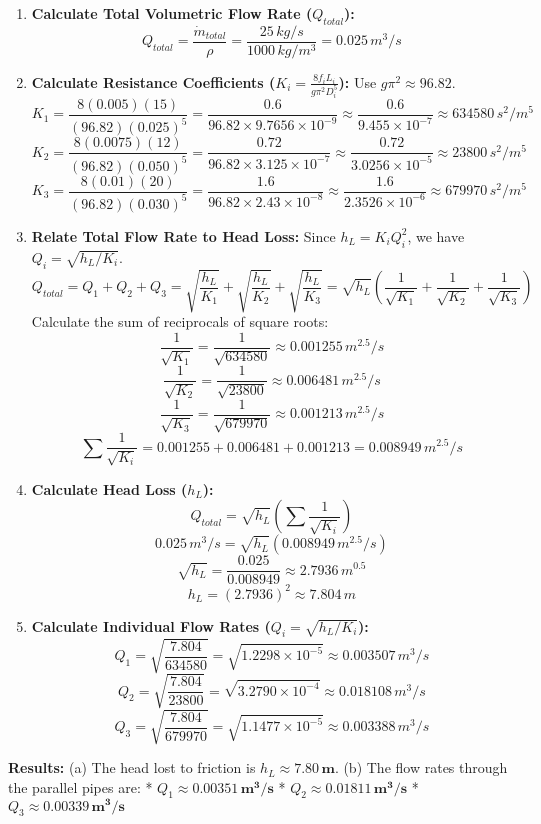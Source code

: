 \begin{enumerate}
\def\labelenumi{\arabic{enumi}.}
\item
  \textbf{Calculate Total Volumetric Flow Rate (\(Q_{total}\)):}
  \[ Q_{total} = \frac{\dot{m}_{total}}{\rho} = \frac{25 \, kg/s}{1000 \, kg/m^3} = 0.025 \, m^3/s \]
\item
  \textbf{Calculate Resistance Coefficients
  (\(K_i = \frac{8 f_i L_i}{g \pi^2 D_i^5}\)):} Use
  \(g \pi^2 \approx 96.82\).
  \[ K_1 = \frac{8 (0.005)(15)}{(96.82)(0.025)^5} = \frac{0.6}{96.82 \times 9.7656 \times 10^{-9}} \approx \frac{0.6}{9.455 \times 10^{-7}} \approx 634580 \, s^2/m^5 \]
  \[ K_2 = \frac{8 (0.0075)(12)}{(96.82)(0.050)^5} = \frac{0.72}{96.82 \times 3.125 \times 10^{-7}} \approx \frac{0.72}{3.0256 \times 10^{-5}} \approx 23800 \, s^2/m^5 \]
  \[ K_3 = \frac{8 (0.01)(20)}{(96.82)(0.030)^5} = \frac{1.6}{96.82 \times 2.43 \times 10^{-8}} \approx \frac{1.6}{2.3526 \times 10^{-6}} \approx 679970 \, s^2/m^5 \]
\item
  \textbf{Relate Total Flow Rate to Head Loss:} Since
  \(h_L = K_i Q_i^2\), we have \(Q_i = \sqrt{h_L / K_i}\).
  \[ Q_{total} = Q_1 + Q_2 + Q_3 = \sqrt{\frac{h_L}{K_1}} + \sqrt{\frac{h_L}{K_2}} + \sqrt{\frac{h_L}{K_3}} = \sqrt{h_L} \left( \frac{1}{\sqrt{K_1}} + \frac{1}{\sqrt{K_2}} + \frac{1}{\sqrt{K_3}} \right) \]
  Calculate the sum of reciprocals of square roots:
  \[ \frac{1}{\sqrt{K_1}} = \frac{1}{\sqrt{634580}} \approx 0.001255 \, m^{2.5}/s \]
  \[ \frac{1}{\sqrt{K_2}} = \frac{1}{\sqrt{23800}} \approx 0.006481 \, m^{2.5}/s \]
  \[ \frac{1}{\sqrt{K_3}} = \frac{1}{\sqrt{679970}} \approx 0.001213 \, m^{2.5}/s \]
  \[ \sum \frac{1}{\sqrt{K_i}} = 0.001255 + 0.006481 + 0.001213 = 0.008949 \, m^{2.5}/s \]
\item
  \textbf{Calculate Head Loss (\(h_L\)):}
  \[ Q_{total} = \sqrt{h_L} \left( \sum \frac{1}{\sqrt{K_i}} \right) \]
  \[ 0.025 \, m^3/s = \sqrt{h_L} (0.008949 \, m^{2.5}/s) \]
  \[ \sqrt{h_L} = \frac{0.025}{0.008949} \approx 2.7936 \, m^{0.5} \]
  \[ h_L = (2.7936)^2 \approx 7.804 \, m \]
\item
  \textbf{Calculate Individual Flow Rates (\(Q_i = \sqrt{h_L / K_i}\)):}
  \[ Q_1 = \sqrt{\frac{7.804}{634580}} = \sqrt{1.2298 \times 10^{-5}} \approx 0.003507 \, m^3/s \]
  \[ Q_2 = \sqrt{\frac{7.804}{23800}} = \sqrt{3.2790 \times 10^{-4}} \approx 0.018108 \, m^3/s \]
  \[ Q_3 = \sqrt{\frac{7.804}{679970}} = \sqrt{1.1477 \times 10^{-5}} \approx 0.003388 \, m^3/s \]
\end{enumerate}

\textbf{Results:} (a) The head lost to friction is
\(h_L \approx \mathbf{7.80 \, m}\). (b) The flow rates through the
parallel pipes are: * \(Q_1 \approx \mathbf{0.00351 \, m^3/s}\) *
\(Q_2 \approx \mathbf{0.01811 \, m^3/s}\) *
\(Q_3 \approx \mathbf{0.00339 \, m^3/s}\)

